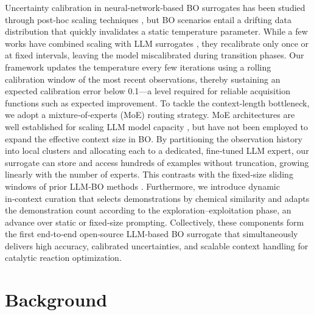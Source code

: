 \documentclass{article}
\begin{document}
Uncertainty calibration in neural‑network‑based BO surrogates has been studied through post‑hoc scaling techniques \cite{guo2017calibration}, but BO scenarios entail a drifting data distribution that quickly invalidates a static temperature parameter. While a few works have combined scaling with LLM surrogates \cite{yang2024llmcalib}, they recalibrate only once or at fixed intervals, leaving the model miscalibrated during transition phases. Our framework updates the temperature every few iterations using a rolling calibration window of the most recent observations, thereby sustaining an expected calibration error below 0.1—a level required for reliable acquisition functions such as expected improvement. To tackle the context‑length bottleneck, we adopt a mixture‑of‑experts (MoE) routing strategy. MoE architectures are well established for scaling LLM model capacity \cite{shazeer2017moe, jiang2024mixtral}, but have not been employed to expand the effective context size in BO. By partitioning the observation history into local clusters and allocating each to a dedicated, fine‑tuned LLM expert, our surrogate can store and access hundreds of examples without truncation, growing linearly with the number of experts. This contrasts with the fixed‑size sliding windows of prior LLM‑BO methods \cite{ramos2023asktell, madaan2023llmbo}. Furthermore, we introduce dynamic in‑context curation that selects demonstrations by chemical similarity and adapts the demonstration count according to the exploration–exploitation phase, an advance over static or fixed‑size prompting. Collectively, these components form the first end‑to‑end open‑source LLM‑based BO surrogate that simultaneously delivers high accuracy, calibrated uncertainties, and scalable context handling for catalytic reaction optimization.

\section{Background}
\end{document}
